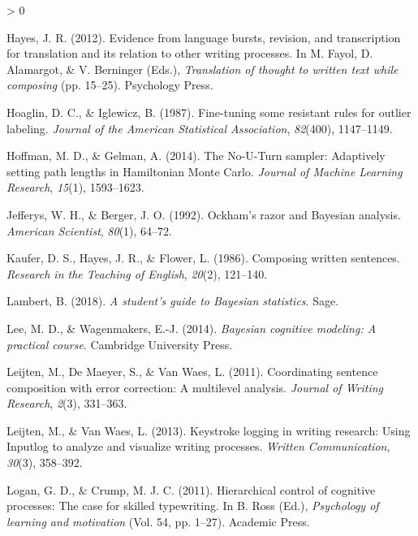 \documentclass[
  english,
  man,mask,floatsintext]{apa7}
\newlength{\cslhangindent}
\newenvironment{CSLReferences}[2] %
 {%
  \setlength{\parindent}{0pt}
  \ifodd #1 \everypar{\setlength{\hangindent}{\cslhangindent}}\ignorespaces\fi
  \ifnum #2 > 0
  \setlength{\parskip}{#2\baselineskip}
  \fi
 }%
 {}
\begin{document}
\begin{CSLReferences}{1}{0}
\leavevmode\hypertarget{ref-hayes2012evidence}{}%
Hayes, J. R. (2012). Evidence from language bursts, revision, and transcription for translation and its relation to other writing processes. In M. Fayol, D. Alamargot, \& V. Berninger (Eds.), \emph{Translation of thought to written text while composing} (pp. 15--25). Psychology Press.

\leavevmode\hypertarget{ref-hoaglin1987fine}{}%
Hoaglin, D. C., \& Iglewicz, B. (1987). Fine-tuning some resistant rules for outlier labeling. \emph{Journal of the American Statistical Association}, \emph{82}(400), 1147--1149.

\leavevmode\hypertarget{ref-hoffman2014no}{}%
Hoffman, M. D., \& Gelman, A. (2014). The {No-U-Turn sampler}: {A}daptively setting path lengths in {H}amiltonian {M}onte {C}arlo. \emph{Journal of Machine Learning Research}, \emph{15}(1), 1593--1623.

\leavevmode\hypertarget{ref-jefferys1992ockham}{}%
Jefferys, W. H., \& Berger, J. O. (1992). Ockham's razor and {B}ayesian analysis. \emph{American Scientist}, \emph{80}(1), 64--72.

\leavevmode\hypertarget{ref-kaufer1986composing}{}%
Kaufer, D. S., Hayes, J. R., \& Flower, L. (1986). Composing written sentences. \emph{Research in the Teaching of {E}nglish}, \emph{20}(2), 121--140.

\leavevmode\hypertarget{ref-lambert2018student}{}%
Lambert, B. (2018). \emph{A student's guide to {B}ayesian statistics}. Sage.

\leavevmode\hypertarget{ref-lee2014bayesian}{}%
Lee, M. D., \& Wagenmakers, E.-J. (2014). \emph{Bayesian cognitive modeling: A practical course}. Cambridge University Press.

\leavevmode\hypertarget{ref-leijten2011coordinating}{}%
Leijten, M., De Maeyer, S., \& Van Waes, L. (2011). Coordinating sentence composition with error correction: A multilevel analysis. \emph{Journal of Writing Research}, \emph{2}(3), 331--363.

\leavevmode\hypertarget{ref-leijten2013keystroke}{}%
Leijten, M., \& Van Waes, L. (2013). Keystroke logging in writing research: Using {Inputlog} to analyze and visualize writing processes. \emph{Written Communication}, \emph{30}(3), 358--392.

\leavevmode\hypertarget{ref-logan2011hierarchical}{}%
Logan, G. D., \& Crump, M. J. C. (2011). Hierarchical control of cognitive processes: The case for skilled typewriting. In B. Ross (Ed.), \emph{Psychology of learning and motivation} (Vol. 54, pp. 1--27). Academic Press.


\end{CSLReferences}
\end{document}
